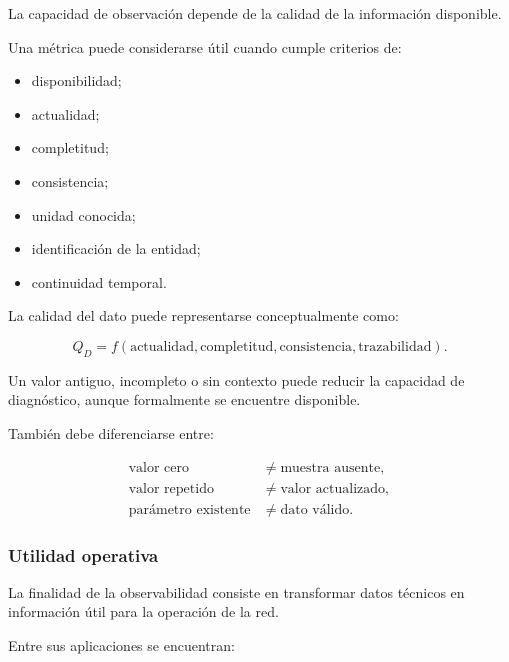 La capacidad de observación depende de la calidad de la información
disponible.

Una métrica puede considerarse útil cuando cumple criterios de:

\begin{itemize}
    \item disponibilidad;

    \item actualidad;

    \item completitud;

    \item consistencia;

    \item unidad conocida;

    \item identificación de la entidad;

    \item continuidad temporal.
\end{itemize}

La calidad del dato puede representarse conceptualmente como:

\[
    Q_D
    =
    f
    \left(
        \text{actualidad},
        \text{completitud},
        \text{consistencia},
        \text{trazabilidad}
    \right).
\]

Un valor antiguo, incompleto o sin contexto puede reducir la capacidad de
diagnóstico, aunque formalmente se encuentre disponible.

También debe diferenciarse entre:

\[
\begin{aligned}
    \text{valor cero}
    &\neq
    \text{muestra ausente},\\
    \text{valor repetido}
    &\neq
    \text{valor actualizado},\\
    \text{parámetro existente}
    &\neq
    \text{dato válido}.
\end{aligned}
\]


\subsubsection*{Utilidad operativa}

La finalidad de la observabilidad consiste en transformar datos técnicos
en información útil para la operación de la red.

Entre sus aplicaciones se encuentran:

